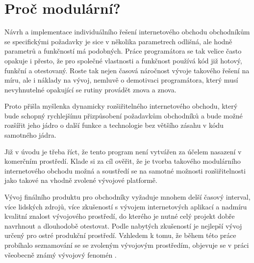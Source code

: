 \documentclass[11pt,twoside,a4paper]{book}
\begin{document}
\section*{Proč modulární?}

Návrh a implementace individuálního řešení internetového obchodu obchodníkům se specifickými požadavky je sice v několika parametrech odlišná, ale hodně parametrů a funkčností má podobných. Práce programátora se tak velice často opakuje i přesto, že pro společné vlastnosti a funkčnost používá kód již hotový, funkční a otestovaný. Roste tak nejen časová náročnost vývoje takového řešení na míru, ale i náklady na vývoj, nemluvě o demotivaci programátora, který musí nevyhnutelné opakující se rutiny provádět znova a znova.

Proto přišla myšlenka dynamicky rozšiřitelného internetového obchodu, který bude schopný rychlejšímu přizpůsobení požadavkům obchodníků a bude možné rozšířit jeho jádro o další funkce a technologie bez většího zásahu v kódu samotného jádra.

Již v úvodu je třeba říct, že tento program není vytvářen za účelem nasazení v komerčním prostředí. Klade si za cíl ověřit, že je tvorba takového modulárního internetového obchodu možná a soustředí se na samotné možnosti rozšiřitelnosti jako takové na vhodně zvolené vývojové platformě.

Vývoj finálního produktu pro obchodníky vyžaduje mnohem delší časový interval, více lidských zdrojů, více zkušeností s vývojem internetových aplikací a nadmíru kvalitní znalost vývojového prostředí, do kterého je nutné celý projekt dobře navrhnout a dlouhodobě otestovat. Podle nabytých zkušeností je nejlepší vývoj určený pro ostré produkční prostředí. Vzhledem k tomu, že během této práce probíhalo seznamování se se zvoleným vývojovým prostředím, objevuje se v práci všeobecně známý vývojový fenomén .
\end{document}
